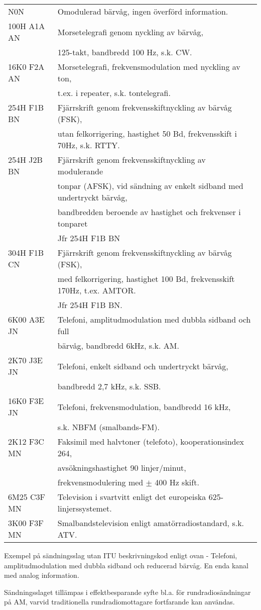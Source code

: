 \begin{tabular}{ll}
	N0N & Omodulerad bärvåg, ingen överförd information.\\
	100H A1A AN & Morsetelegrafi genom nyckling av bärvåg,\\
	& 125-takt, bandbredd 100 Hz, s.k. CW.\\
	16K0 F2A AN & Morsetelegrafi, frekvensmodulation med nyckling av ton,\\
	& t.ex. i repeater, s.k. tontelegrafi.\\
	254H F1B BN & Fjärrskrift genom frekvensskiftnyckling av bärvåg (FSK),\\
	& utan felkorrigering, hastighet 50 Bd, frekvensskift i 70Hz, s.k. RTTY.\\
	254H J2B BN & Fjärrskrift genom frekvensskiftnyckling av modulerande\\
	& tonpar (AFSK), vid sändning av enkelt sidband med undertryckt bärvåg,\\
	& bandbredden beroende av hastighet och frekvenser i tonparet\\
	& Jfr 254H F1B BN\\
	304H F1B CN & Fjärrskrift genom frekvensskiftnyckling av bärvåg (FSK),\\
	& med felkorrigering, hastighet 100 Bd, frekvensskift 170Hz, t.ex. AMTOR.\\
	& Jfr 254H F1B BN.\\
	6K00 A3E JN & Telefoni, amplitudmodulation med dubbla sidband och full\\
	& bärvåg, bandbredd 6kHz, s.k. AM.\\
	2K70 J3E JN & Telefoni, enkelt sidband och undertryckt bärvåg,\\
	& bandbredd 2,7 kHz, s.k. SSB.\\
	16K0 F3E JN & Telefoni, frekvensmodulation, bandbredd 16 kHz,\\
	& s.k. NBFM (smalbands-FM).\\
	2K12 F3C MN & Faksimil med halvtoner (telefoto), kooperationsindex 264,\\
	& avsökningshastighet 90 linjer/minut,\\
	& frekvensmodulering med \(\pm\) 400 Hz skift.\\
	6M25 C3F MN & Television i svartvitt enligt det europeiska 625-linjerssystemet.\\
	3K00 F3F MN & Smalbandstelevision enligt amatörradiostandard, s.k. ATV.\\
\end{tabular}

Exempel på sändningsslag utan ITU beskrivningskod enligt ovan
- Telefoni, amplitudmodulation med dubbla sidband och reducerad bärvåg.
En enda kanal med analog information.

Sändningsslaget tillämpas i effektbesparande syfte bl.a. för rundradiosändningar
på AM, varvid traditionella rundradiomottagare fortfarande kan användas.
